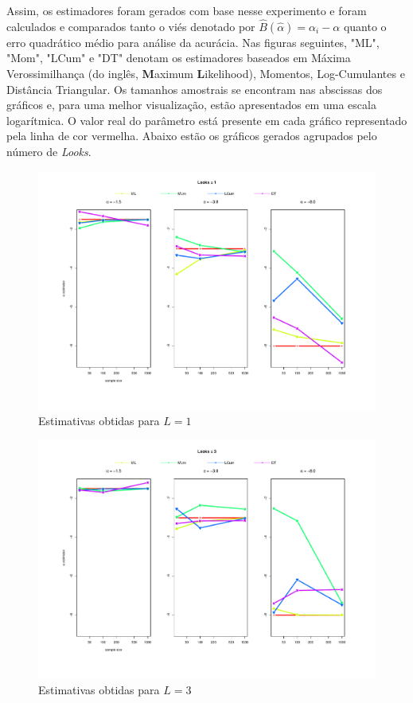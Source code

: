 Assim, os estimadores foram gerados com base nesse experimento e foram calculados e comparados tanto o viés denotado por $\widehat{B}(\widehat{\alpha}) = \alpha_i - \alpha$ quanto o erro quadrático médio para análise da acurácia. Nas figuras seguintes, "ML", "Mom", "LCum" e "DT" denotam os estimadores baseados em Máxima Verossimilhança (do inglês, \textbf{M}aximum \textbf{L}ikelihood), Momentos, Log-Cumulantes e Distância Triangular. Os tamanhos amostrais se encontram nas abscissas dos gráficos e, para uma melhor visualização, estão apresentados em uma escala logarítmica. O valor real do parâmetro está presente em cada gráfico representado pela linha de cor vermelha. Abaixo estão os gráficos gerados agrupados pelo número de \textit{Looks}.
\begin{figure}[H]
     \centering
     \includegraphics[scale=0.5]{plots/estimators_L=1.pdf}
     \caption{Estimativas obtidas para $L=1$}
     \label{graf_8}
\end{figure}
\begin{figure}[H]
     \centering
     \includegraphics[scale=0.5]{plots/estimators_L=3.pdf}
     \caption{Estimativas obtidas para $L=3$}
     \label{graf_9}
\end{figure}
